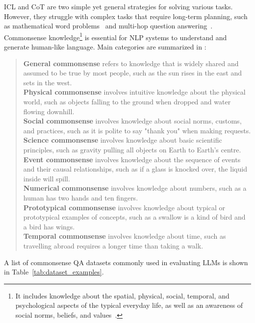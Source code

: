 ICL and CoT are two simple yet general strategies for solving various tasks.
However, they struggle with complex tasks that require long-term planning, such as mathematical word problems~\cite{qian2022limitations} and multi-hop question answering~\cite{bian2024chatgpt}.
Commonsense knowledge\footnote{It includes knowledge about the spatial,
	physical, social, temporal, and psychological aspects of the typical everyday life, as well as an awareness of social norms, beliefs, and values~\cite{liu2004conceptnet}.} is essential for NLP systems to understand and generate human-like language.
Main categories are summarized in \textcite{bian2024chatgpt}:
\begin{quote}
	\textbf{General commonsense} refers to knowledge that is widely shared and assumed to be true by most people, such as the sun rises in the east and sets in the west.\\
	\textbf{Physical commonsense} involves intuitive knowledge about the physical world, such as objects falling to the ground when dropped and water flowing downhill.\\
	\textbf{Social commonsense} involves knowledge about social norms, customs, and practices, such as it is polite to say "thank you" when
	making requests.\\
	\textbf{Science commonsense} involves knowledge about basic scientific principles, such as gravity pulling all objects on Earth to Earth’s centre.\\
	\textbf{Event commonsense} involves knowledge about the sequence of events and their causal relationships, such as if a glass is knocked over, the liquid inside will spill.\\
	\textbf{Numerical commonsense} involves knowledge about numbers, such as a human has two hands and ten fingers.\\
	\textbf{Prototypical commonsense} involves knowledge about typical or prototypical examples of concepts, such as a swallow is a kind of bird and a bird has wings.\\
	\textbf{Temporal commonsense} involves knowledge about time, such as travelling abroad requires a longer time than taking a walk.
\end{quote}
A list of commonsense QA datasets commonly used in evaluating LLMs is shown in Table~\ref{tab:dataset_examples}.
